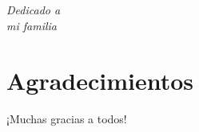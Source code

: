 \documentclass[../main.tex]{subfiles}
\begin{document}
    \chapter*{}
    \begin{flushright}
        \textit{Dedicado a \\
            mi familia}
    \end{flushright}
    
    \chapter*{Agradecimientos} %
    ¡Muchas gracias a todos!
\end{document}
